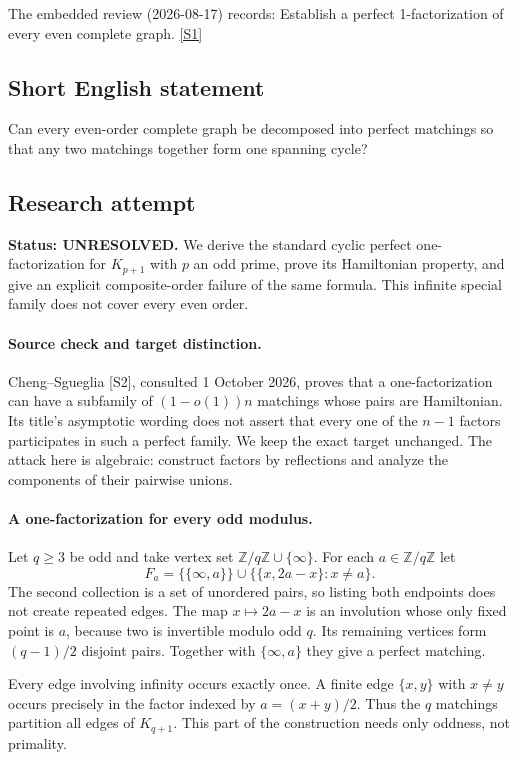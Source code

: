 \documentclass[11pt,a4paper]{article}
\newcommand{\sref}[2]{\hyperlink{source:#1:#2}{[S#2]}}
\begin{document}
The embedded review (2026-08-17) records: Establish a perfect 1-factorization of every even complete graph. \sref{statement}{1}

\subsection{Short English statement}

Can every even-order complete graph be decomposed into perfect matchings so that any two matchings together form one spanning cycle?

\subsection{Research attempt}
\textbf{Status: UNRESOLVED.} We derive the standard cyclic perfect one-factorization for $K_{p+1}$ with $p$ an odd prime, prove its Hamiltonian property, and give an explicit composite-order failure of the same formula. This infinite special family does not cover every even order.

\paragraph{Source check and target distinction.}
Cheng--Sgueglia [S2], consulted 1 October 2026, proves that a one-factorization can have a subfamily of $(1-o(1))n$ matchings whose pairs are Hamiltonian. Its title's asymptotic wording does not assert that every one of the $n-1$ factors participates in such a perfect family. We keep the exact target unchanged. The attack here is algebraic: construct factors by reflections and analyze the components of their pairwise unions.

\paragraph{A one-factorization for every odd modulus.}
Let $q\ge3$ be odd and take vertex set $\mathbb Z/q\mathbb Z\cup\{\infty\}$. For each $a\in\mathbb Z/q\mathbb Z$ let
\[
F_a=\{\{\infty,a\}\}\cup
\{\{x,2a-x\}:x\ne a\}.
\]
The second collection is a set of unordered pairs, so listing both endpoints does not create repeated edges. The map $x\mapsto2a-x$ is an involution whose only fixed point is $a$, because two is invertible modulo odd $q$. Its remaining vertices form $(q-1)/2$ disjoint pairs. Together with $\{\infty,a\}$ they give a perfect matching.

Every edge involving infinity occurs exactly once. A finite edge $\{x,y\}$ with $x\ne y$ occurs precisely in the factor indexed by $a=(x+y)/2$. Thus the $q$ matchings partition all edges of $K_{q+1}$. This part of the construction needs only oddness, not primality.
\end{document}
